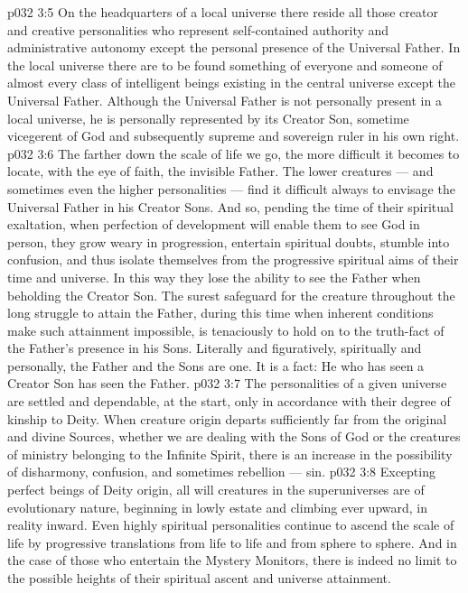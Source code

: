 \vs p032 3:5 On the headquarters of a local universe there reside all those creator and creative personalities who represent self\hyp{}contained authority and administrative autonomy except the personal presence of the Universal Father. In the local universe there are to be found something of everyone and someone of almost every class of intelligent beings existing in the central universe except the Universal Father. Although the Universal Father is not personally present in a local universe, he is personally represented by its Creator Son, sometime vicegerent of God and subsequently supreme and sovereign ruler in his own right.
\vs p032 3:6 The farther down the scale of life we go, the more difficult it becomes to locate, with the eye of faith, the invisible Father. The lower creatures --- and sometimes even the higher personalities --- find it difficult always to envisage the Universal Father in his Creator Sons. And so, pending the time of their spiritual exaltation, when perfection of development will enable them to see God in person, they grow weary in progression, entertain spiritual doubts, stumble into confusion, and thus isolate themselves from the progressive spiritual aims of their time and universe. In this way they lose the ability to see the Father when beholding the Creator Son. The surest safeguard for the creature throughout the long struggle to attain the Father, during this time when inherent conditions make such attainment impossible, is tenaciously to hold on to the truth\hyp{}fact of the Father’s presence in his Sons. Literally and figuratively, spiritually and personally, the Father and the Sons are one. It is a fact: He who has seen a Creator Son has seen the Father.
\vs p032 3:7 \pc The personalities of a given universe are settled and dependable, at the start, only in accordance with their degree of kinship to Deity. When creature origin departs sufficiently far from the original and divine Sources, whether we are dealing with the Sons of God or the creatures of ministry belonging to the Infinite Spirit, there is an increase in the possibility of disharmony, confusion, and sometimes rebellion --- sin.
\vs p032 3:8 \pc Excepting perfect beings of Deity origin, all will creatures in the superuniverses are of evolutionary nature, beginning in lowly estate and climbing ever upward, in reality inward. Even highly spiritual personalities continue to ascend the scale of life by progressive translations from life to life and from sphere to sphere. And in the case of those who entertain the Mystery Monitors, there is indeed no limit to the possible heights of their spiritual ascent and universe attainment.
